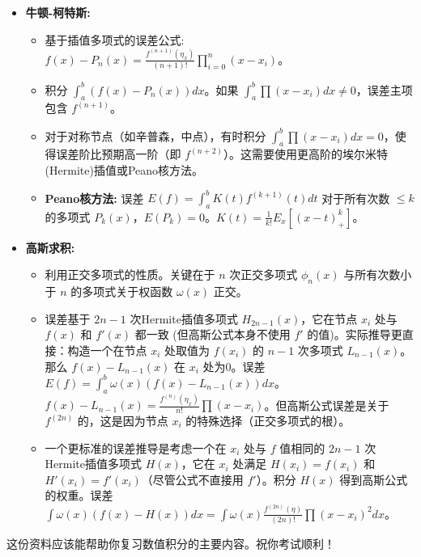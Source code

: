 \begin{itemize}
	\item \textbf{牛顿-柯特斯:}
	\begin{itemize}
		\item 基于插值多项式的误差公式: $f(x) - P_n(x) = \frac{f^{(n+1)}(\eta_x)}{(n+1)!} \prod_{i=0}^n (x-x_i)$。
		\item 积分 $\int_a^b (f(x)-P_n(x))dx$。如果 $\int_a^b \prod (x-x_i) dx \neq 0$，误差主项包含 $f^{(n+1)}$。
		\item 对于对称节点（如辛普森，中点），有时积分 $\int_a^b \prod (x-x_i) dx = 0$，使得误差阶比预期高一阶（即 $f^{(n+2)}$）。这需要使用更高阶的埃尔米特(Hermite)插值或Peano核方法。
		\item \textbf{Peano核方法:} 误差 $E(f) = \int_a^b K(t) f^{(k+1)}(t) dt$ 对于所有次数 $\le k$ 的多项式 $P_k(x)$，$E(P_k)=0$。$K(t) = \frac{1}{k!} E_x[(x-t)_+^k]$。
	\end{itemize}
	\item \textbf{高斯求积:}
	\begin{itemize}
		\item 利用正交多项式的性质。关键在于 $n$ 次正交多项式 $\phi_n(x)$ 与所有次数小于 $n$ 的多项式关于权函数 $\omega(x)$ 正交。
		\item 误差基于 $2n-1$ 次Hermite插值多项式 $H_{2n-1}(x)$，它在节点 $x_i$ 处与 $f(x)$ 和 $f'(x)$ 都一致 (但高斯公式本身不使用 $f'$ 的值)。实际推导更直接：构造一个在节点 $x_i$ 处取值为 $f(x_i)$ 的 $n-1$ 次多项式 $L_{n-1}(x)$。那么 $f(x)-L_{n-1}(x)$ 在 $x_i$ 处为0。误差 $E(f) = \int_a^b \omega(x) (f(x)-L_{n-1}(x)) dx$。 $f(x)-L_{n-1}(x) = \frac{f^{(n)}(\eta_x)}{n!} \prod (x-x_i)$。但高斯公式误差是关于 $f^{(2n)}$ 的，这是因为节点 $x_i$ 的特殊选择（正交多项式的根）。
		\item 一个更标准的误差推导是考虑一个在 $x_i$ 处与 $f$ 值相同的 $2n-1$ 次Hermite插值多项式 $H(x)$，它在 $x_i$ 处满足 $H(x_i)=f(x_i)$ 和 $H'(x_i)=f'(x_i)$（尽管公式不直接用 $f'$）。积分 $H(x)$ 得到高斯公式的权重。误差 $\int \omega(x)(f(x)-H(x))dx = \int \omega(x) \frac{f^{(2n)}(\eta)}{(2n)!} \prod (x-x_i)^2 dx$。
	\end{itemize}
\end{itemize}

这份资料应该能帮助你复习数值积分的主要内容。祝你考试顺利！

